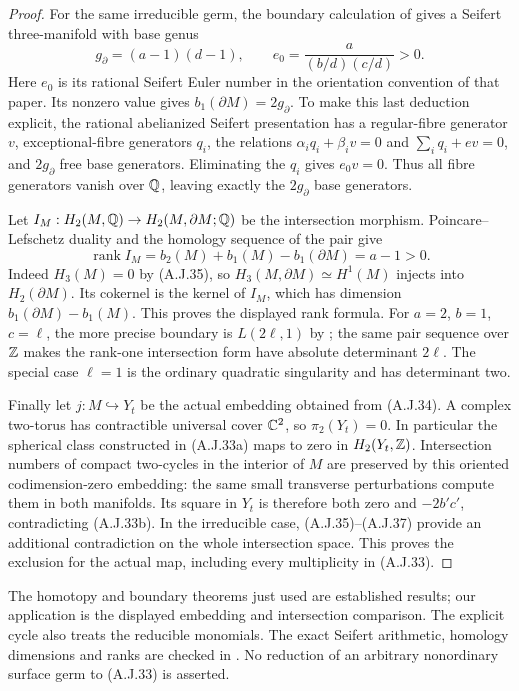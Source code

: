 \begin{proof}
For the same irreducible germ, the boundary calculation
of \cite[Theorem 4.1 and Lemma 4.6]{MPW2005Hirzebruch}
gives a Seifert three-manifold with base genus
\[
 g_\partial=(a-1)(d-1),\qquad
 e_0=\frac{a}{(b/d)(c/d)}>0.                     \tag{A.J.36}
\]
Here $e_0$ is its rational Seifert Euler number in
the orientation convention of that paper. Its
nonzero value gives
$b_1(\partial M)=2g_\partial$. To make this last
deduction explicit, the rational abelianized Seifert
presentation has a regular-fibre generator $v$,
exceptional-fibre generators $q_i$, the relations
$\alpha_iq_i+\beta_iv=0$ and
$\sum_iq_i+ev=0$, and $2g_\partial$ free base
generators. Eliminating the $q_i$ gives $e_0v=0$.
Thus all fibre generators vanish over $\mathbb Q$, leaving
exactly the $2g_\partial$ base generators.

Let $I_M:H_2(M,\mathbb Q)\to H_2(M,\partial M;\mathbb Q)$ be
the intersection morphism. Poincare--Lefschetz duality
and the homology sequence of the pair give
\[
 \operatorname{rank} I_M
   =b_2(M)+b_1(M)-b_1(\partial M)=a-1>0.          \tag{A.J.37}
\]
Indeed $H_3(M)=0$ by (A.J.35), so
$H_3(M,\partial M)\simeq H^1(M)$ injects into
$H_2(\partial M)$. Its cokernel is the kernel of
$I_M$, which has dimension
$b_1(\partial M)-b_1(M)$. This proves the displayed
rank formula. For $a=2$, $b=1$, $c=\ell$, the
more precise boundary is $L(2\ell,1)$ by
\cite[Theorem 4.2(2)]{MPW2005Hirzebruch}; the same
pair sequence over $\mathbb Z$ makes the rank-one
intersection form have absolute determinant
$2\ell$. The special case $\ell=1$ is the ordinary
quadratic singularity and has determinant two.

Finally let $j:M\hookrightarrow Y_t$ be the actual
embedding obtained from (A.J.34). A complex two-torus
has contractible universal cover $\mathbb C^2$, so
$\pi_2(Y_t)=0$. In particular the spherical class
constructed in (A.J.33a) maps to zero in
$H_2(Y_t,\mathbb Z)$. Intersection numbers of compact
two-cycles in the interior of $M$ are preserved by
this oriented codimension-zero embedding: the same
small transverse perturbations compute them in
both manifolds. Its square in $Y_t$ is therefore
both zero and $-2b'c'$, contradicting (A.J.33b).
In the irreducible case, (A.J.35)--(A.J.37) provide
an additional contradiction on the whole intersection
space.
This proves the exclusion for the actual map,
including every multiplicity in (A.J.33).
\end{proof}

The homotopy and boundary theorems just used are
established results; our application is the displayed
embedding and intersection comparison. The explicit
cycle also treats the reducible monomials. The exact
Seifert arithmetic, homology dimensions and ranks
are checked in . No
reduction of an arbitrary nonordinary surface germ
to (A.J.33) is asserted.



